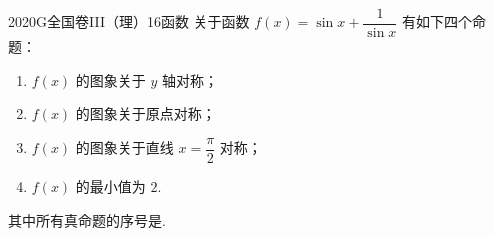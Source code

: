 
\begin{problem}{2020}{G}{全国卷III（理）}{16}{函数}
关于函数 $ f(x) = \sin x + \dfrac{1}{\sin x} $ 有如下四个命题：
\begin{enumerate}
\item $ f(x) $ 的图象关于 $ y $ 轴对称；
\item $ f(x) $ 的图象关于原点对称；
\item $ f(x) $ 的图象关于直线 $ x = \dfrac{\pi}{2} $ 对称；
\item $ f(x) $ 的最小值为 $ 2 $.
\end{enumerate}
其中所有真命题的序号是\underline{\hspace{4em}}.
\end{problem}

\begin{answer}

\end{answer}

\begin{solutions}

\end{solutions}